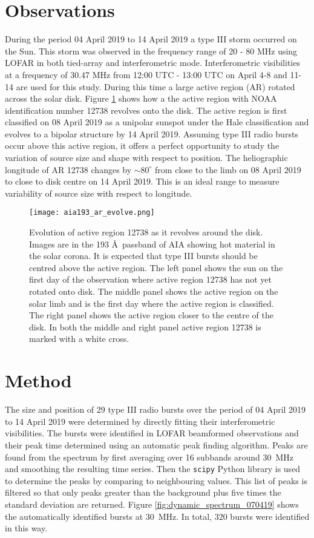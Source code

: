 \section{Observations}
\label{obsvtheory_observations}
During the period 04 April 2019 to 14 April 2019 a type III storm occurred on the Sun. This storm was observed in the frequency range of 20 - 80 MHz using LOFAR in both tied-array and interferometric mode. Interferometric visibilities at a frequency of 30.47 MHz from 12:00 UTC - 13:00 UTC on April 4-8 and 11-14 are used for this study. During this time a large active region (AR) rotated across the solar disk. Figure \ref{fig:ar_evolve} shows how a the active region with NOAA identification number 12738 revolves onto the disk. The active region is first classified on 08 April 2019 as a unipolar sunspot under the Hale classification and evolves to a bipolar structure by 14 April 2019. Assuming type III radio bursts occur above this active region, it offers a perfect opportunity to study the variation of source size and shape with respect to position. The heliographic longitude of AR 12738 changes by $\sim 80^\circ$ from close to the limb on 08 April 2019 to close to disk centre on 14 April 2019. This is an ideal range to measure variability of source size with respect to longitude.

\begin{figure}[ht]
\centering
\texttt{[image: aia193\_ar\_evolve.png]}
\caption[Evolution of active region 12738 as it revolves around the disk.]{Evolution of active region 12738 as it revolves around the disk. Images are in the 193 \AA \ passband of AIA showing hot material in the solar corona. It is expected that type III bursts should be centred above the active region. The left panel shows the sun on the first day of the observation where active region 12738 has not yet rotated onto disk. The middle panel shows the active region on the solar limb and is the first day where the active region is classified. The right panel shows the active region closer to the centre of the disk. In both the middle and right panel active region 12738 is marked with a white cross.}
\label{fig:ar_evolve}
\end{figure}

\section{Method}
\label{sec:obsvtheory_method}
The size and position of 29 type III radio bursts over the period of 04 April 2019 to 14 April 2019 were determined by directly fitting their interferometric visibilities. The bursts were identified in LOFAR beamformed observations and their peak time determined using an automatic peak finding algorithm. Peaks are found from the spectrum by first averaging over 16 subbands around 30~MHz and smoothing the resulting time series. Then the \texttt{scipy} Python library \citep{Virtanen2020} is used to determine the peaks by comparing to neighbouring values. This list of peaks is filtered so that only peaks greater than the background plus five times the standard deviation are returned.
Figure \ref{fig:dynamic_spectrum_070419} shows the automatically identified bursts at 30~MHz. In total, 320 bursts were identified in this way. 

